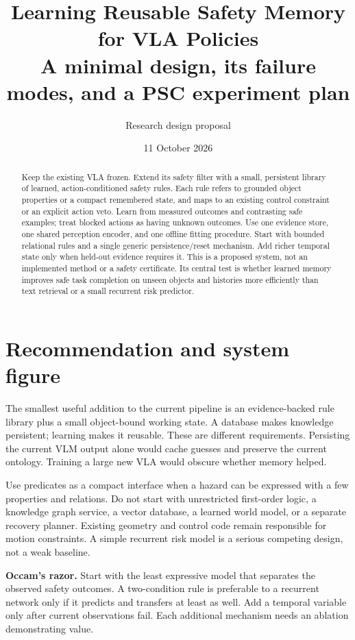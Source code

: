 \documentclass[10pt]{article}
\title{Learning Reusable Safety Memory for VLA Policies\\\large A minimal design, its failure modes, and a PSC experiment plan}
\author{Research design proposal}
\date{11 October 2026}
\begin{document}
\maketitle
\vspace{-1.5em}
\begin{abstract}
Keep the existing VLA frozen. Extend its safety filter with a small, persistent library of learned, action-conditioned safety rules. Each rule refers to grounded object properties or a compact remembered state, and maps to an existing control constraint or an explicit action veto. Learn from measured outcomes and contrasting safe examples; treat blocked actions as having unknown outcomes. Use one evidence store, one shared perception encoder, and one offline fitting procedure. Start with bounded relational rules and a single generic persistence/reset mechanism. Add richer temporal state only when held-out evidence requires it. This is a proposed system, not an implemented method or a safety certificate. Its central test is whether learned memory improves safe task completion on unseen objects and histories more efficiently than text retrieval or a small recurrent risk predictor.
\end{abstract}

\section{Recommendation and system figure}
The smallest useful addition to the current pipeline is an evidence-backed rule library plus a small object-bound working state. A database makes knowledge persistent; learning makes it reusable. These are different requirements. Persisting the current VLM output alone would cache guesses and preserve the current ontology. Training a large new VLA would obscure whether memory helped.

Use predicates as a compact interface when a hazard can be expressed with a few properties and relations. Do not start with unrestricted first-order logic, a knowledge graph service, a vector database, a learned world model, or a separate recovery planner. Existing geometry and control code remain responsible for motion constraints. A simple recurrent risk model is a serious competing design, not a weak baseline.



\textbf{Occam's razor.} Start with the least expressive model that separates the observed safety outcomes. A two-condition rule is preferable to a recurrent network only if it predicts and transfers at least as well. Add a temporal variable only after current observations fail. Each additional mechanism needs an ablation demonstrating value.
\end{document}

